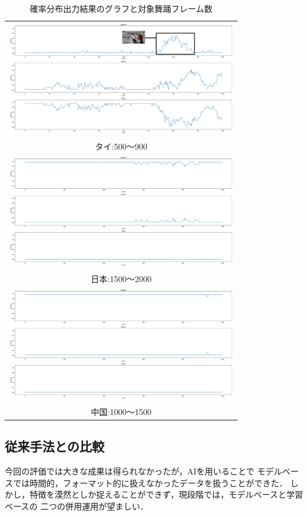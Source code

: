 \begin{table}[b]
  \begin{center}
    \begin{tabular}{c}
      \includegraphics[width=100mm]{images/dist/thai_elegant_900.pdf} \\ タイ:500〜900 \\
      \includegraphics[width=100mm]{images/dist/japanese_elegant_2000.pdf} \\ 日本:1500〜2000 \\
      \includegraphics[width=100mm]{images/dist/chinese_elegant_1500.pdf} \\ 中国:1000〜1500 \\
    \end{tabular}
  \end{center}
  \caption{確率分布出力結果のグラフと対象舞踊フレーム数}
  \label{net_dist}
\end{table}
\clearpage

\subsection{従来手法との比較}
今回の評価では大きな成果は得られなかったが，AIを用いることで
モデルベースでは時間的，フォーマット的に扱えなかったデータを扱うことができた．
しかし，特徴を漠然としか捉えることができず，現段階では，モデルベースと学習ベースの
二つの併用運用が望ましい．

